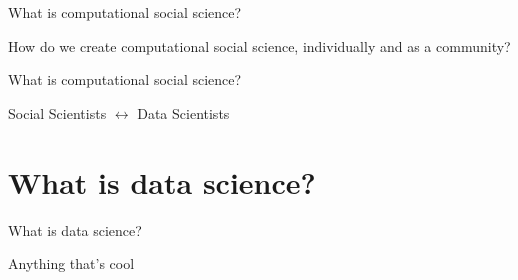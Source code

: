 \documentclass{beamer}
\begin{document}
\begin{frame}{What is computational social science?}

\begin{center}
\LARGE{How do we create computational social science, individually and as a community?}
\end{center}

\end{frame}
\begin{frame}{What is computational social science?}

\begin{center}
\LARGE{Social Scientists $\longleftrightarrow$ Data Scientists}
\end{center}

\end{frame}

\section{What is data science?}

\begin{frame}{What is data science?}

\begin{center}
\LARGE{Anything that's cool}
\end{center}

\end{frame}
\end{document}
